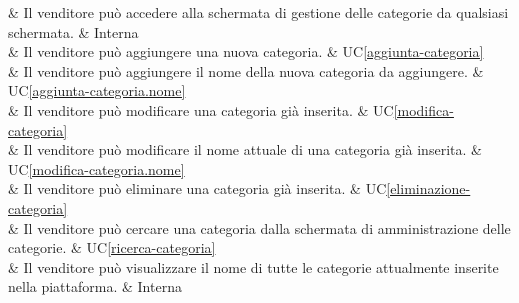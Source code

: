  & Il venditore può accedere alla schermata di gestione delle categorie da qualsiasi schermata. & Interna \\

 & Il venditore può aggiungere una nuova categoria. & UC\ref{aggiunta-categoria} \\
    
 & Il venditore può aggiungere il nome della nuova categoria da aggiungere. & UC\ref{aggiunta-categoria.nome} \\
    
 & Il venditore può modificare una categoria già inserita. & UC\ref{modifica-categoria} \\
    
 & Il venditore può modificare il nome attuale di una categoria già inserita. & UC\ref{modifica-categoria.nome} \\

 & Il venditore può eliminare una categoria già inserita. & UC\ref{eliminazione-categoria} \\

 & Il venditore può cercare una categoria dalla schermata di amministrazione delle categorie. & UC\ref{ricerca-categoria} \\

 & Il venditore può visualizzare il nome di tutte le categorie attualmente inserite nella piattaforma. & Interna \\

